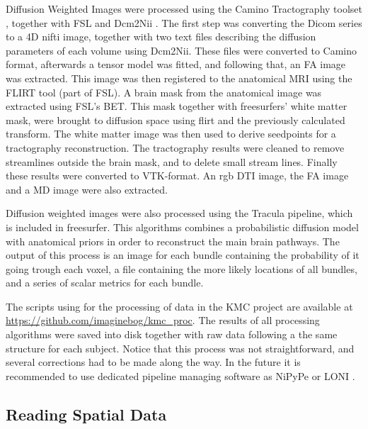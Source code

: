 Diffusion Weighted Images were processed using the Camino Tractography toolset \autocite{cook_camino:_2006}, together with FSL \autocite{jenkinson_fsl_2012} and Dcm2Nii \autocite{rorden_mricron_2007}. The first step was converting the Dicom series to a 4D nifti image, together with two text files describing the diffusion parameters of each volume using Dcm2Nii. These files were converted to Camino format, afterwards a tensor model was fitted, and  following that, an FA image was extracted. This image was then registered to the anatomical MRI using the FLIRT tool (part of FSL). A brain mask from the anatomical image was extracted using FSL's BET. This mask together with freesurfers' white matter mask, were brought to diffusion space using flirt and the previously calculated transform. The white matter image was then used to derive seedpoints for a tractography reconstruction. The tractography results were cleaned to remove streamlines outside the brain mask, and to delete small stream lines. Finally these results were converted to VTK-format. An rgb DTI image, the FA image and a MD image were also extracted.  

Diffusion weighted images were also processed using the Tracula \autocite{yendiki_fully_2009} pipeline, which is included in freesurfer. This algorithms combines a probabilistic diffusion model with anatomical priors in order to reconstruct the main brain pathways. The output of this process is an image for each bundle containing the probability of it going trough each voxel, a file containing the more likely locations of all bundles, and a series of scalar metrics for each bundle.

The scripts using for the processing of data in the KMC project are available at \url{https://github.com/imaginebog/kmc_proc}. The results of all processing algorithms were saved into disk together with raw data following a the same structure for each subject. Notice that this process was not straightforward, and several corrections had to be made along the way. In the future it is recommended to use dedicated pipeline managing software as NiPyPe \autocite{gorgolewski_nipype:_2011} or LONI \autocite{dinov_efficient_2009}.

\subsection{Reading Spatial Data}

